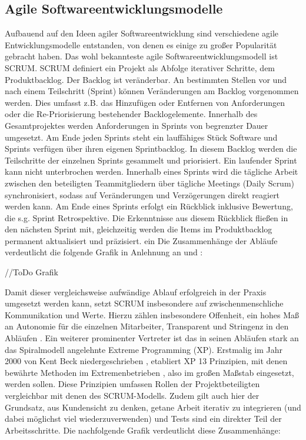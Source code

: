 \subsection{Agile Softwareentwicklungsmodelle}
\label{Agile Softwareentwicklungsmodelle}
Aufbauend auf den Ideen agiler Softwareentwicklung sind verschiedene agile Entwicklungsmodelle entstanden, von denen es einige zu großer Popularität gebracht haben. Das wohl bekannteste agile Softwareentwicklungsmodell ist \gls{SCRUM}.\newline
\gls{SCRUM} definiert ein Projekt als Abfolge iterativer Schritte, dem Produktbacklog. Der Backlog ist veränderbar. An bestimmten Stellen vor und nach einem Teilschritt (Sprint) können Veränderungen am Backlog vorgenommen werden. Dies umfasst z.B. das Hinzufügen oder Entfernen von Anforderungen oder die Re-Priorisierung bestehender Backlogelemente. Innerhalb des Gesamtprojektes werden Anforderungen in Sprints von begrenzter Dauer umgesetzt. Am Ende jeden Sprints steht ein lauffähiges Stück Software und Sprints verfügen über ihren eigenen Sprintbacklog. In diesem Backlog werden die Teilschritte der einzelnen Sprints gesammelt und priorisiert. Ein laufender Sprint kann nicht unterbrochen werden. Innerhalb eines Sprints wird die tägliche Arbeit zwischen den beteiligten Teammitgliedern über tägliche Meetings (Daily Scrum) synchronisiert, sodass auf Veränderungen und Verzögerungen direkt reagiert werden kann. Am Ende eines Sprints erfolgt ein Rückblick inklusive Bewertung, die s.g. Sprint Retrospektive. Die Erkenntnisse aus diesem Rückblick fließen in den nächsten Sprint mit, gleichzeitig werden die Items im Produktbacklog permanent aktualisiert und präzisiert. ein Die Zusammenhänge der Abläufe verdeutlicht die folgende Grafik in Anlehnung an \cite{SCRUM_Framework_nodate} und \cite[Abb. 1]{moniruzzaman2013comparative}:

//ToDo Grafik

Damit dieser vergleichsweise aufwändige Ablauf erfolgreich in der Praxis umgesetzt werden kann, setzt \gls{SCRUM} insbesondere auf zwischenmenschliche Kommunikation und Werte. Hierzu zählen insbesondere Offenheit, ein hohes Maß an Autonomie für die einzelnen Mitarbeiter, Transparent und Stringenz in den Abläufen \cite{SCRUM_values_nodate}.\newline
Ein weiterer prominenter Vertreter ist das in seinen Abläufen stark an das Spiralmodell angelehnte Extreme Programming (\acrshort{XP}). Erstmalig im Jahr 2000 von Kent Beck niedergeschrieben \cite{beck_extreme_2000}, etabliert \acrshort{XP} 13 Prinzipien, mit denen bewährte Methoden \glqq im Extremen\grqq betrieben , also im großen Maßstab eingesetzt, werden sollen.
Diese Prinzipien umfassen Rollen der Projektbeteiligten vergleichbar mit denen des \gls{SCRUM}-Modells. Zudem gilt auch hier der Grundsatz, aus Kundensicht zu denken, getane Arbeit iterativ zu integrieren (und dabei möglichst viel wiederzuverwenden) und Tests sind ein direkter Teil der Arbeitsschritte. Die nachfolgende Grafik verdeutlicht diese Zusammenhänge:

